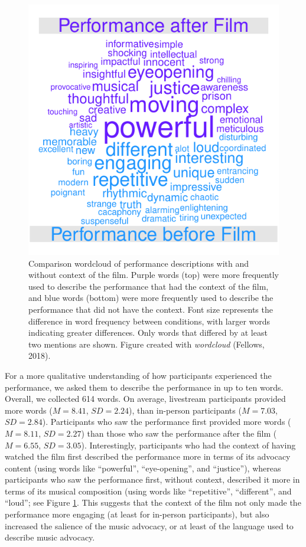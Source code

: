 \documentclass[
  man,floatsintext]{apa6}
\begin{document}
\begin{figure}
\centering
\includegraphics{Schlichting_MSc_Thesis_files/figure-latex/wordcloud-comparison-1.pdf}
\caption{\label{fig:wordcloud-comparison}Comparison wordcloud of performance descriptions with and without context of the film. Purple words (top) were more frequently used to describe the performance that had the context of the film, and blue words (bottom) were more frequently used to describe the performance that did not have the context. Font size represents the difference in word frequency between conditions, with larger words indicating greater differences. Only words that differed by at least two mentions are shown. Figure created with \emph{wordcloud} (Fellows, 2018).}
\end{figure}

For a more qualitative understanding of how participants experienced the performance, we asked them to describe the performance in up to ten words. Overall, we collected 614 words. On average, livestream participants provided more words (\(M = 8.41\), \(SD = 2.24\)), than in-person participants (\(M = 7.03\), \(SD = 2.84\)). Participants who saw the performance first provided more words (\(M = 8.11\), \(SD = 2.27\)) than those who saw the performance after the film (\(M = 6.55\), \(SD = 3.05\)). Interestingly, participants who had the context of having watched the film first described the performance more in terms of its advocacy content (using words like ``powerful'', ``eye-opening'', and ``justice''), whereas participants who saw the performance first, without context, described it more in terms of its musical composition (using words like ``repetitive'', ``different'', and ``loud''; see Figure \ref{fig:wordcloud-comparison}. This suggests that the context of the film not only made the performance more engaging (at least for in-person participants), but also increased the salience of the music advocacy, or at least of the language used to describe music advocacy.
\end{document}
